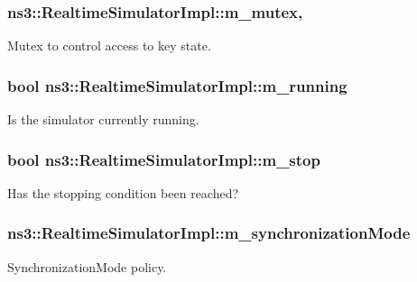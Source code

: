 \subsubsection[{\texorpdfstring{m\+\_\+mutex}{m_mutex}}]{ ns3\+::\+Realtime\+Simulator\+Impl\+::m\+\_\+mutex\hspace{0.3cm}{\ttfamily [mutable]}, {\ttfamily [private]}}\hypertarget{classns3_1_1RealtimeSimulatorImpl_a02be368e7cbd8a6f9d62db36c3fd373b}{}\label{classns3_1_1RealtimeSimulatorImpl_a02be368e7cbd8a6f9d62db36c3fd373b}
Mutex to control access to key state. 
\subsubsection[{\texorpdfstring{m\+\_\+running}{m_running}}]{\setlength{\rightskip}{0pt plus 5cm}bool ns3\+::\+Realtime\+Simulator\+Impl\+::m\+\_\+running\hspace{0.3cm}{\ttfamily [private]}}\hypertarget{classns3_1_1RealtimeSimulatorImpl_a4907d7e58b7221984a86d5f63439ea8d}{}\label{classns3_1_1RealtimeSimulatorImpl_a4907d7e58b7221984a86d5f63439ea8d}
Is the simulator currently running. 
\subsubsection[{\texorpdfstring{m\+\_\+stop}{m_stop}}]{\setlength{\rightskip}{0pt plus 5cm}bool ns3\+::\+Realtime\+Simulator\+Impl\+::m\+\_\+stop\hspace{0.3cm}{\ttfamily [private]}}\hypertarget{classns3_1_1RealtimeSimulatorImpl_a8393aba34f9e1c9ab56475c2165547c9}{}\label{classns3_1_1RealtimeSimulatorImpl_a8393aba34f9e1c9ab56475c2165547c9}
Has the stopping condition been reached? 
\subsubsection[{\texorpdfstring{m\+\_\+synchronization\+Mode}{m_synchronizationMode}}]{ ns3\+::\+Realtime\+Simulator\+Impl\+::m\+\_\+synchronization\+Mode\hspace{0.3cm}{\ttfamily [private]}}\hypertarget{classns3_1_1RealtimeSimulatorImpl_a55d84defcf54c7751df163578ea90872}{}\label{classns3_1_1RealtimeSimulatorImpl_a55d84defcf54c7751df163578ea90872}
Synchronization\+Mode policy. 
